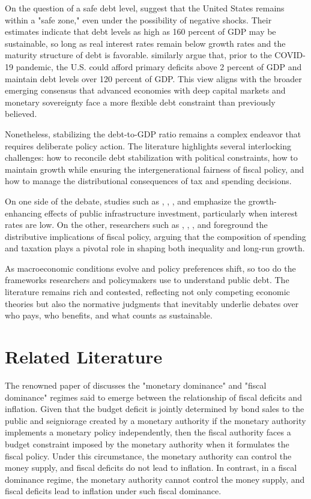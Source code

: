 \documentclass[12pt, titlepage]{article}
\numberwithin{equation}{section}
\begin{document}
	On the question of a safe debt level, \cite{Debrun2020} suggest that the United States remains within a "safe zone," even under the possibility of negative shocks. Their estimates indicate that debt levels as high as 160 percent of GDP may be sustainable, so long as real interest rates remain below growth rates and the maturity structure of debt is favorable. \cite{Mian2024} similarly argue that, prior to the COVID-19 pandemic, the U.S. could afford primary deficits above 2 percent of GDP and maintain debt levels over 120 percent of GDP. This view aligns with the broader emerging consensus that advanced economies with deep capital markets and monetary sovereignty face a more flexible debt constraint than previously believed.

	Nonetheless, stabilizing the debt-to-GDP ratio remains a complex endeavor that requires deliberate policy action. The literature highlights several interlocking challenges: how to reconcile debt stabilization with political constraints, how to maintain growth while ensuring the intergenerational fairness of fiscal policy, and how to manage the distributional consequences of tax and spending decisions.

	On one side of the debate, studies such as \cite{Boushey2019}, \cite{Ramey2021}, \cite{Fieldhouse2023}, and \cite{DynanElmendorf2024} emphasize the growth-enhancing effects of public infrastructure investment, particularly when interest rates are low. On the other, researchers such as \cite{YouDutt1996}, \cite{Chetty2017}, \cite{PikettySaez2019}, and \cite{CaseDeaton2023} foreground the distributive implications of fiscal policy, arguing that the composition of spending and taxation plays a pivotal role in shaping both inequality and long-run growth.

	As macroeconomic conditions evolve and policy preferences shift, so too do the frameworks researchers and policymakers use to understand public debt. The literature remains rich and contested, reflecting not only competing economic theories but also the normative judgments that inevitably underlie debates over who pays, who benefits, and what counts as sustainable.




	\section{Related Literature}

	The renowned paper of \cite{Sargent81} discusses
	the "monetary dominance" and "fiscal dominance" regimes said to emerge between the relationship of fiscal deficits  and inflation. Given that the budget deficit is jointly determined by bond sales to the public and seigniorage created by a monetary authority if the monetary authority implements a monetary policy independently, then the fiscal authority faces a budget constraint imposed by the monetary authority when it formulates the fiscal policy. Under this circumstance, the monetary authority can control the money supply, and fiscal deficits do not lead to inflation. In contrast, in a fiscal dominance regime, the monetary authority cannot control the money supply, and fiscal deficits lead to inflation under such fiscal dominance.
\end{document}
